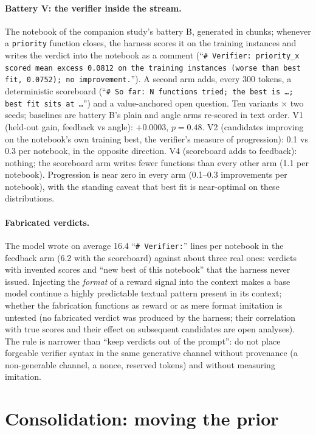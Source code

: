 \documentclass[11pt]{article}
\begin{document}
\paragraph{Battery V: the verifier inside the stream.} The notebook of the
companion study's battery B, generated in chunks; whenever a
\texttt{priority} function closes, the harness scores it on the training
instances and writes the verdict into the notebook as a comment
(``\texttt{\# Verifier: priority\_x scored mean excess 0.0812 on the
training instances (worse than best fit, 0.0752); no improvement.}''). A
second arm adds, every 300 tokens, a deterministic scoreboard (``\texttt{\#
So far: N functions tried; the best is \ldots; best fit sits at \ldots}'')
and a value-anchored open question. Ten variants $\times$ two seeds;
baselines are battery B's plain and angle arms re-scored in text order.
V1 (held-out gain, feedback vs angle): $+0.0003$, $p=0.48$. V2 (candidates
improving on the notebook's own training best, the verifier's measure of
progression): 0.1 vs 0.3 per notebook, in the opposite direction. V4
(scoreboard adds to feedback): nothing; the scoreboard arm writes fewer
functions than every other arm (1.1 per notebook). Progression is near zero in every arm
(0.1--0.3 improvements per notebook), with the standing caveat that best fit
is near-optimal on these distributions.

\paragraph{Fabricated verdicts.} The model wrote on average 16.4
``\texttt{\# Verifier:}'' lines per notebook in the feedback arm (6.2 with
the scoreboard) against about three real ones: verdicts with invented
scores and ``new best of this notebook'' that the harness never issued.
Injecting the \emph{format} of a reward signal into the context makes a
base model continue a highly predictable textual pattern present in its
context; whether the fabrication functions as reward or as mere format
imitation is untested (no fabricated verdict was produced by the harness;
their correlation with true scores and their effect on subsequent
candidates are open analyses). The rule is narrower than ``keep verdicts
out of the prompt'': do not place forgeable verifier syntax in the same
generative channel without provenance (a non-generable channel, a nonce,
reserved tokens) and without measuring imitation.

\section{Consolidation: moving the prior}
\label{sec:consolidation}
\end{document}
